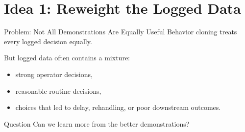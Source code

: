 \section{Idea 1: Reweight the Logged Data}

\begin{frame}{Problem: Not All Demonstrations Are Equally Useful}
  Behavior cloning treats every logged decision equally.

  \vspace{0.4cm}
  But logged data often contains a mixture:
  \begin{itemize}
    \item strong operator decisions,
    \item reasonable routine decisions,
    \item choices that led to delay, rehandling, or poor downstream outcomes.
  \end{itemize}

  \vspace{0.35cm}
  \begin{block}{Question}
    Can we learn more from the better demonstrations?
  \end{block}
\end{frame}


